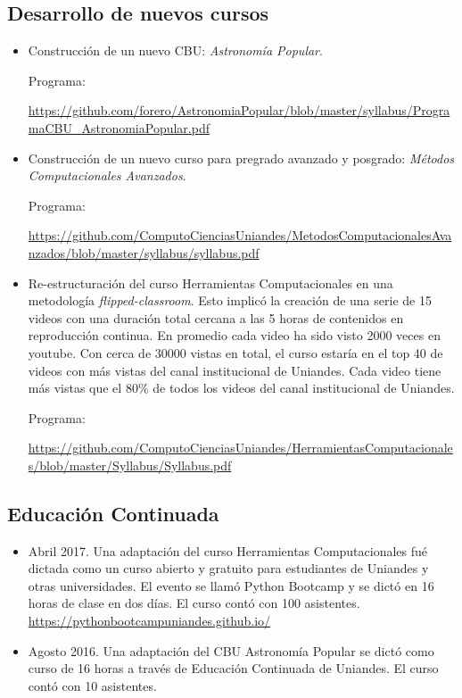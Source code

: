 \documentclass{article}
\begin{document}
\subsection{Desarrollo de nuevos cursos}
\begin{itemize}
\item Construcci\'on de un nuevo CBU: \emph{Astronom\'ia Popular}.

Programa:

\url{https://github.com/forero/AstronomiaPopular/blob/master/syllabus/ProgramaCBU_AstronomiaPopular.pdf}

\item Construcci\'on de un nuevo curso para pregrado avanzado y
  posgrado: \emph{M\'etodos Computacionales Avanzados}.

Programa:

\url{https://github.com/ComputoCienciasUniandes/MetodosComputacionalesAvanzados/blob/master/syllabus/syllabus.pdf}
\item Re-estructuraci\'on del curso Herramientas Computacionales en
  una metodolog\'ia \emph{flipped-classroom}.
Esto implic\'o la creaci\'on de una serie de 15 videos con una duraci\'on total cercana a las 5 horas de contenidos en reproducci\'on continua.
En promedio cada video ha sido visto 2000 veces en youtube.
Con cerca de 30000 vistas en total, el curso estaría en el top 40 de videos con más vistas del canal institucional de Uniandes.
Cada video tiene más vistas que el 80$\%$ de todos los videos del canal
institucional de Uniandes.

Programa:

\url{https://github.com/ComputoCienciasUniandes/HerramientasComputacionales/blob/master/Syllabus/Syllabus.pdf}    
\end{itemize}

\subsection{Educaci\'on Continuada}
\begin{itemize}
\item Abril 2017. Una adaptaci\'on del curso Herramientas Computacionales fu\'e
  dictada como un curso abierto y gratuito para estudiantes de
  Uniandes y otras universidades. El evento se llam\'o Python Bootcamp
  y se dict\'o en 16 horas de clase en dos d\'ias. El curso cont\'o
  con 100 asistentes. \url{https://pythonbootcampuniandes.github.io/}
\item Agosto 2016. Una adaptaci\'on del CBU Astronom\'ia Popular se dict\'o como
  curso de 16 horas a trav\'es de Educaci\'on Continuada de
  Uniandes. El curso cont\'o con 10 asistentes.
\end{itemize}
\end{document}
